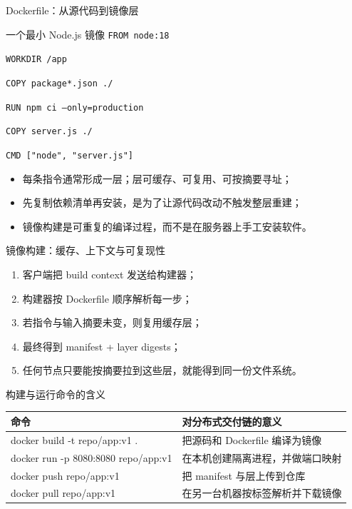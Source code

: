 \documentclass[UTF8,fontset=none,aspectratio=169,10pt]{beamer}
\begin{document}
\begin{frame}{Dockerfile：从源代码到镜像层}
\scriptsize
\begin{block}{一个最小 Node.js 镜像}
\texttt{FROM node:18}\par
\texttt{WORKDIR /app}\par
\texttt{COPY package*.json ./}\par
\texttt{RUN npm ci --only=production}\par
\texttt{COPY server.js ./}\par
\texttt{CMD ["node", "server.js"]}
\end{block}
\begin{itemize}
  \item 每条指令通常形成一层；层可缓存、可复用、可按摘要寻址；
  \item 先复制依赖清单再安装，是为了让源代码改动不触发整层重建；
  \item 镜像构建是可重复的编译过程，而不是在服务器上手工安装软件。
\end{itemize}
\end{frame}

\begin{frame}{镜像构建：缓存、上下文与可复现性}
\begin{enumerate}
  \item 客户端把 build context 发送给构建器；
  \item 构建器按 Dockerfile 顺序解析每一步；
  \item 若指令与输入摘要未变，则复用缓存层；
  \item 最终得到 manifest + layer digests；
  \item 任何节点只要能按摘要拉到这些层，就能得到同一份文件系统。
\end{enumerate}
\vfill
{}
\end{frame}

\begin{frame}{构建与运行命令的含义}
\begin{tabularx}{\linewidth}{>{\ttfamily}p{4.2cm}X}
\toprule
命令 & 对分布式交付链的意义 \\
\midrule
docker build -t repo/app:v1 . & 把源码和 Dockerfile 编译为镜像 \\
docker run -p 8080:8080 repo/app:v1 & 在本机创建隔离进程，并做端口映射 \\
docker push repo/app:v1 & 把 manifest 与层上传到仓库 \\
docker pull repo/app:v1 & 在另一台机器按标签解析并下载镜像 \\
\bottomrule
\end{tabularx}
\vfill
{}
\end{frame}
\end{document}

